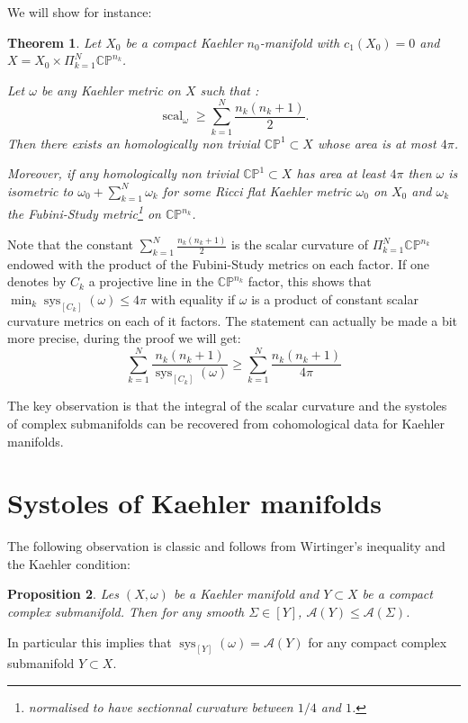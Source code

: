 \documentclass{amsart}
\newtheorem{theorem}{Theorem}[section]
\newtheorem{proposition}[theorem]{Proposition}
\numberwithin{equation}{section}
\theoremstyle {definition}
\DeclareMathOperator{\scal}{scal}
\DeclareMathOperator{\sys}{sys}
\begin{document}
We will show for instance:

\begin{theorem}\label{thm_prod_proj}
    Let $X_0$ be a compact Kaehler $n_0$-manifold
    with $c_1(X_0)=0$ %
    and $X=X_0\times\Pi_{k=1}^N\mathbb{CP}^{n_k}$. %

    Let $\omega$ be any Kaehler metric on $X$ such that :
    \[\scal_\omega\geq \sum_{k=1}^N \frac{n_k(n_k+1)}{2}.\]
    Then there exists an homologically non trivial $\mathbb{CP}^1\subset X$ whose area is at most $4\pi$.

    Moreover, if any homologically non trivial $\mathbb{CP}^1\subset X$ has area at least $4\pi$ then $\omega$ is isometric to $\omega_0+\sum_{k=1}^N\omega_k$ for some Ricci flat Kaehler metric $\omega_0$ on $X_0$ and $\omega_k$ the Fubini-Study metric\footnote{normalised to have sectionnal curvature between $1/4$ and $1$.} on $\mathbb{CP}^{n_k}$.
\end{theorem}

Note that the constant $\sum_{k=1}^N \frac{n_k(n_k+1)}{2}$ is the scalar curvature of $\Pi_{k=1}^N\mathbb{CP}^{n_k}$ endowed with the product of the Fubini-Study metrics on each factor.
If one denotes by $C_k$ a projective line in the $\mathbb{CP}^{n_k}$ factor, this shows that $\min_k\sys_{[C_k]}(\omega)\leq 4\pi$ with equality if $\omega$ is a product of constant scalar curvature metrics on each of it factors. The statement can actually be made a bit more precise, during the proof we will get:
\[\sum_{k=1}^N\frac{n_k(n_k+1)}{\sys_{[C_k]}(\omega)}\geq \sum_{k=1}^N \frac{n_k(n_k+1)}{4\pi}\]

The key observation is that the integral of the scalar curvature and the systoles of complex submanifolds can be recovered from cohomological data for Kaehler manifolds.


\section{Systoles of Kaehler manifolds}

The following observation is classic and follows from Wirtinger's inequality and the Kaehler condition:
\begin{proposition}
    Les $(X,\omega)$ be a Kaehler manifold and $Y\subset X$ be a compact complex submanifold. Then for any smooth $\Sigma\in [Y]$, $\mathcal{A}(Y)\leq\mathcal{A}(\Sigma)$.
\end{proposition}
In particular this implies that $\sys_{[Y]}(\omega)=\mathcal{A}(Y)$ for any compact complex submanifold $Y\subset X$.
\end{document}

